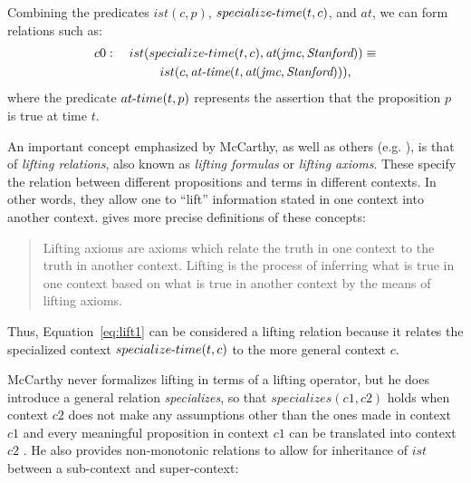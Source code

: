 Combining the predicates $ist(c, p)$, $specialize\textnormal{-}time(t, c)$, and $at$, we can form relations such as:
\begin{equation}
\label{eq:lift1}
\begin{aligned}
c0: \quad ist(specialize\textnormal{-}time(t,c),\hbox{\it at}
(\hbox{\it jmc},\hbox{\it Stanford}))
\equiv \\
ist(c,\hbox{\it at-time}(t,\hbox{\it at}(\hbox{\it jmc},
\hbox{\it Stanford}))),
\qquad
\end{aligned}
\end{equation}
where the predicate $at\textnormal{-}time(t,p)$ represents the assertion that the proposition $p$ is true at time $t$. 

An important concept emphasized by McCarthy, as well as others (e.g. \cite{guha1991contexts}), is that of \emph{lifting relations}, also known as \emph{lifting formulas} or \emph{lifting axioms}. These specify the relation between different propositions and terms in different contexts. In other words, they allow one to ``lift'' information stated in one context into another context. \cite{mccarthy1997formalizing} gives more precise definitions of these concepts:
\begin{quote}
Lifting axioms are axioms which relate the truth in one context
to the truth in another context.
Lifting is the process of inferring what is true in one context based
on what is true in another context by the means of lifting axioms.
\end{quote}
Thus, Equation~\ref{eq:lift1} can be considered a lifting relation because it relates the specialized context $specialize\textnormal{-}time(t, c)$ to the more general context $c$. 

McCarthy never formalizes lifting in terms of a lifting operator, but he does introduce a general relation \emph{specializes}, so that $specializes(c1,c2)$ holds when context $c2$ does not make any assumptions other than the ones made in context $c1$ and every meaningful proposition in context $c1$ can be translated into context $c2$ \cite{McCarthy1993}. He also provides non-monotonic relations to allow for inheritance of $ist$ between a sub-context and super-context:

